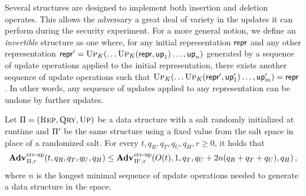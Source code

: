 
Several structures are designed to implement both insertion and deletion operates. This allows the adversary a great deal of variety in the updates it can perform during the security experiment. For a more general notion, we define an \textit{invertible} structure as one where, for any initial representation $\mathsf{repr}$ and any other representation $\mathsf{repr}' = \textnormal{\textsc{Up}}_K(\ldots\textnormal{\textsc{Up}}_K(\mathsf{repr},\mathsf{up}_1)\ldots,\mathsf{up}_n)$ generated by a sequence of update operations applied to the initial representation, there exists another sequence of update operations such that $\textnormal{\textsc{Up}}_K(\ldots\textnormal{\textsc{Up}}_K(\mathsf{repr}',\mathsf{up}'_1)\ldots,\mathsf{up}'_m) = \mathsf{repr}$. In other words, any sequence of updates applied to any representation can be undone by further updates.

\begin{lemma}\label{lemma:noinvsalt}
  Let $\mathrm{\Pi} = (\textnormal{\textsc{Rep}}, \textnormal{\textsc{Qry}}, \textnormal{\textsc{Up}})$ be a data structure with a salt randomly initialized at runtime and $\mathrm{\Pi}'$ be the same structure using a fixed value from the salt space in place of a randomized salt. For every $t, q_R, q_T, q_U, q_H, r\geq 0$, it holds that
  \[
    \Adv{\errep}_{\struct,r}(t, q_R, q_T, q_U, q_H) \leq
    \Adv{\errep}_{\struct',r}(O(t), 1, q_T, q_U+2n(q_R+q_T+q_U), q_H) \,,
  \]
  where $n$ is the longest minimal sequence of update operations needed to generate a data structure in the space.
\end{lemma}
